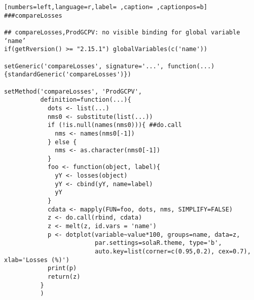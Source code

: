 \begin{lstlisting}[numbers=left,language=r,label= ,caption= ,captionpos=b]
###compareLosses

## compareLosses,ProdGCPV: no visible binding for global variable ‘name’
if(getRversion() >= "2.15.1") globalVariables(c('name'))

setGeneric('compareLosses', signature='...', function(...){standardGeneric('compareLosses')})

setMethod('compareLosses', 'ProdGCPV',
          definition=function(...){
            dots <- list(...)
            nms0 <- substitute(list(...))
            if (!is.null(names(nms0))){ ##do.call
              nms <- names(nms0[-1])
            } else {
              nms <- as.character(nms0[-1])
            }
            foo <- function(object, label){
              yY <- losses(object)
              yY <- cbind(yY, name=label)
              yY
            }
            cdata <- mapply(FUN=foo, dots, nms, SIMPLIFY=FALSE)
            z <- do.call(rbind, cdata)
            z <- melt(z, id.vars = 'name')
            p <- dotplot(variable~value*100, groups=name, data=z,
                         par.settings=solaR.theme, type='b',
                         auto.key=list(corner=c(0.95,0.2), cex=0.7), xlab='Losses (%)')
            print(p)
            return(z)
          }
          )
\end{lstlisting}

